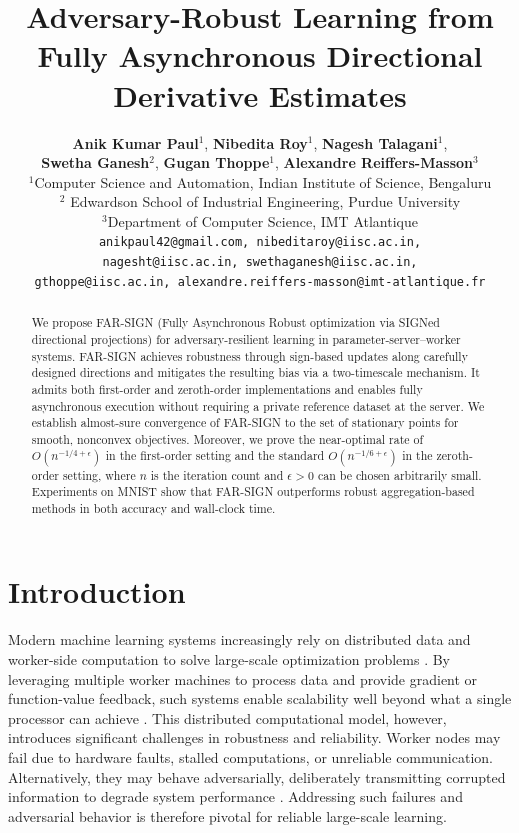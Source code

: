 \documentclass{article}
\title{Adversary-Robust Learning from Fully Asynchronous Directional Derivative Estimates}
\author{
\textbf{Anik Kumar Paul}$^{1}$, \textbf{Nibedita Roy}$^{1}$, \textbf{Nagesh Talagani}$^{1}$, \\ \textbf{Swetha Ganesh}$^{2}$, \textbf{Gugan Thoppe}$^{1}$, \textbf{Alexandre Reiffers-Masson}$^{3}$\\
$^{1}$Computer Science and Automation, Indian Institute of Science, Bengaluru\\
$^{2}$ Edwardson School of Industrial Engineering, Purdue University\\
$^{3}$Department of Computer Science, IMT Atlantique\\
\vspace{1mm}
\texttt{anikpaul42@gmail.com, nibeditaroy@iisc.ac.in,} \\ \texttt{nagesht@iisc.ac.in,
swethaganesh@iisc.ac.in,}\\ \texttt{gthoppe@iisc.ac.in, alexandre.reiffers-masson@imt-atlantique.fr}
}
\newcommand{\farsign}{FAR-SIGN\xspace}
\begin{document}
\maketitle


\begin{abstract}
    We propose \farsign{} (Fully Asynchronous Robust optimization via SIGNed directional projections) for adversary-resilient learning in parameter-server--worker systems. \farsign{} achieves robustness through sign-based updates along carefully designed directions and mitigates the resulting bias via a two-timescale mechanism. It admits both first-order and zeroth-order implementations and enables fully asynchronous execution without requiring a private reference dataset at the server. We establish almost-sure convergence of \farsign{} to the set of stationary points for smooth, nonconvex objectives. Moreover, we prove the near-optimal rate of $O(n^{-1/4+\epsilon})$ in the first-order setting and the standard $O(n^{-1/6+\epsilon})$ in the zeroth-order setting, where $n$ is the iteration count and $\epsilon>0$ can be chosen arbitrarily small. Experiments on MNIST show that \farsign{} outperforms robust aggregation-based methods in both accuracy and wall-clock time.
\end{abstract}

\section{Introduction}

Modern machine learning systems increasingly rely on distributed data and worker-side computation to solve large-scale optimization problems \citep{bottou2018optimization}. 
By leveraging multiple worker machines to process data and provide gradient or function-value feedback, such systems enable scalability well beyond what a single processor can achieve \citep{konevcny2016federated,McMahan2017federated}. 
This distributed computational model, however, introduces significant challenges in robustness and reliability. 
Worker nodes may fail due to hardware faults, stalled computations, or unreliable communication. 
Alternatively, they may behave adversarially, deliberately transmitting corrupted information to degrade system performance \citep{lamport1982byzantine}. 
Addressing such failures and adversarial behavior is therefore pivotal for reliable large-scale learning.
\end{document}
